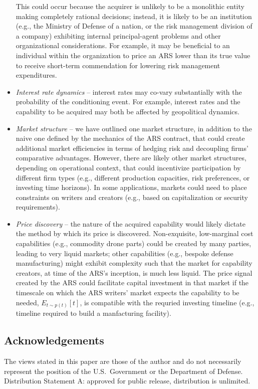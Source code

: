 \documentclass{article}
\begin{document}
\begin{itemize}
{    This could occur because the acquirer is unlikely to be a monolithic entity making completely rational decisions; instead, it is likely to be an institution (e.g., the Ministry of Defense of a nation, or the risk management division of a company) exhibiting internal principal-agent problems and other organizational considerations.
    For example, it may be beneficial to an individual within the organization to price an ARS lower than its true value to receive short-term commendation for lowering risk management expenditures.
    }
    \item \textit{Interest rate dynamics} -- interest rates may co-vary substantially with the probability of the conditioning event.
    For example, interest rates and the capability to be acquired may both be affected by geopolitical dynamics.
    \item \textit{Market structure} -- we have outlined one market structure, in addition to the naive one defined by the mechanics of the ARS contract, that could create additional market efficiencies in terms of hedging risk and decoupling firms' comparative advantages. However, there are likely other market structures, depending on operational context, that could incentivize participation by different firm types (e.g., different production capacities, risk preferences, or investing time horizons). In some applications, markets could need to place constraints on writers and creators (e.g., based on capitalization or security requirements).
    \item \textit{Price discovery} -- the nature of the acquired capability would likely dictate the method by which its price is discovered. Non-exquisite, low-marginal cost capabilities (e.g., commodity drone parts) could be created by many parties, leading to very liquid markets; other capabilities (e.g., bespoke defense manufacturing) might exhibit complexity such that the market for capability creators, at time of the ARS's inception, is much less liquid. 
    The price signal created by the ARS could facilitate capital investment in that market if the timescale on which the ARS writers' market expects the capability to be needed, $E_{t \sim p(t)} [t]$, is compatible with the requried investing timeline (e.g., timeline required to build a manfacturing facility).
    
\end{itemize}

\subsection*{Acknowledgements}
The views stated in this paper are those of the author and do not necessarily represent the position of the U.S.\ Government or the Department of Defense.
Distribution Statement A: approved for public release, distribution is unlimited.



\end{document}
